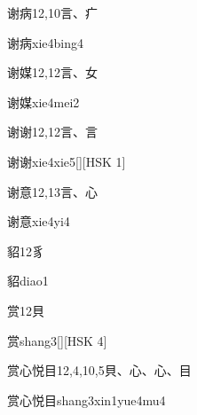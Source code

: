\begin{entry}{谢病}{12,10}{⾔、⽧}
  \begin{phonetics}{谢病}{xie4bing4}
  \end{phonetics}
\end{entry}

\begin{entry}{谢媒}{12,12}{⾔、⼥}
  \begin{phonetics}{谢媒}{xie4mei2}
  \end{phonetics}
\end{entry}

\begin{entry}{谢谢}{12,12}{⾔、⾔}
  \begin{phonetics}{谢谢}{xie4xie5}[][HSK 1]
  \end{phonetics}
\end{entry}

\begin{entry}{谢意}{12,13}{⾔、⼼}
  \begin{phonetics}{谢意}{xie4yi4}
  \end{phonetics}
\end{entry}

\begin{entry}{貂}{12}{⾘}
  \begin{phonetics}{貂}{diao1}
  \end{phonetics}
\end{entry}

\begin{entry}{赏}{12}{⾙}
  \begin{phonetics}{赏}{shang3}[][HSK 4]
  \end{phonetics}
\end{entry}

\begin{entry}{赏心悦目}{12,4,10,5}{⾙、⼼、⼼、⽬}
  \begin{phonetics}{赏心悦目}{shang3xin1yue4mu4}
  \end{phonetics}
\end{entry}

